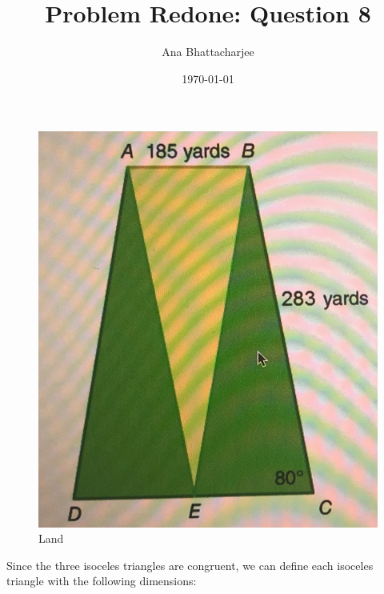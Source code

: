 \documentclass{article}
\begin{document}
\title{Problem Redone: Question 8}
\author{Ana Bhattacharjee}
\date{\today}
\maketitle

\begin{center}
  \begin{figure}[!htbp]
    \includegraphics[width=0.90\columnwidth]{new_image}
    \caption{Land}
  \end{figure}
  Since the three isoceles triangles are congruent, we can define each isoceles triangle with the following dimensions:
\end{center}
\end{document}
